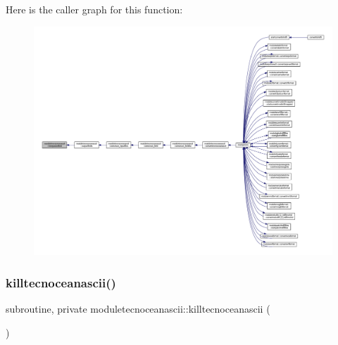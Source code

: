 Here is the caller graph for this function\+:\nopagebreak
\begin{figure}[H]
\begin{center}
\leavevmode
\includegraphics[width=350pt]{namespacemoduletecnoceanascii_a305beb20ba1bce59460e369c5385e130_icgraph}
\end{center}
\end{figure}
\mbox{\label{namespacemoduletecnoceanascii_a324e7114be8b0d39a6c4a80c55f2dcc1}} 
\subsubsection{\texorpdfstring{killtecnoceanascii()}{killtecnoceanascii()}}
{\footnotesize\ttfamily subroutine, private moduletecnoceanascii\+::killtecnoceanascii (\begin{DoxyParamCaption}{ }\end{DoxyParamCaption})\hspace{0.3cm}{\ttfamily [private]}}

